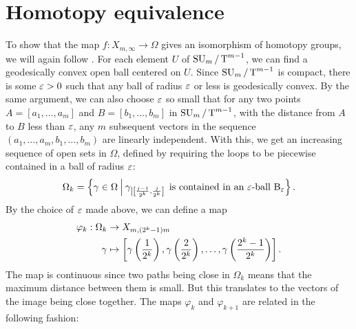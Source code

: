 \section{Homotopy equivalence}

To show that the map $f : X_{m,\infty} \to \Omega$
gives an isomorphism of homotopy groups, we will again follow
\cite{milnor}. For each element $U$ of $\operatorname{SU}_{m}/\operatorname{T}^{m-1}$, we can find a 
geodesically convex open ball centered on $U$. Since $\operatorname{SU}_{m}/\operatorname{T}^{m-1}$
is compact, there is some $\varepsilon > 0$ such that any ball of radius $\varepsilon$
or less is geodesically convex. By the same argument, we can also
choose $\varepsilon$ so small that for any two points $A= [a_1,\dots, a_m]$ and
$B=[b_1,\dots,b_m]$ in $\operatorname{SU}_{m}/\operatorname{T}^{m-1}$, with the distance from $A$ to $B$ less
than $\varepsilon$, any $m$ subsequent vectors in the sequence
$(a_1,\dots,a_m,b_1,\dots,b_m)$ are linearly
independent. 
With this, we get an increasing sequence of open sets in $\Omega$,
defined by requiring the loops to be piecewise contained in a ball of
radius $\varepsilon$:
\[ \Omega_k = \left\{ \gamma \in \Omega \: \Big\vert\:
  \gamma_{\left|\left[ \frac{j-1}{2^k},\frac{j}{2^k} \right]\right.} \text{ is
  contained in an $\varepsilon$-ball $\mathrm{B}_\varepsilon$}  \right\}. \]
By the choice of $\varepsilon$ made above, we can define a map
\begin{align*}
  \varphi_k : \Omega_k &\to X_{m,(2^k-1)m} \\
  \gamma &\mapsto \left[ \gamma\left(\frac{1}{2^k}\right),
    \gamma\left(\frac{2}{2^k}\right), \dots,
    \gamma\left(\frac{2^k-1}{2^k}\right) \right].
\end{align*}
The map is continuous since two paths being close in $\Omega_k$ means
that the maximum distance between them is small. But this translates
to the vectors of the image being close together. The maps $\varphi_k$
and $\varphi_{k+1}$ are related in the following fashion:

